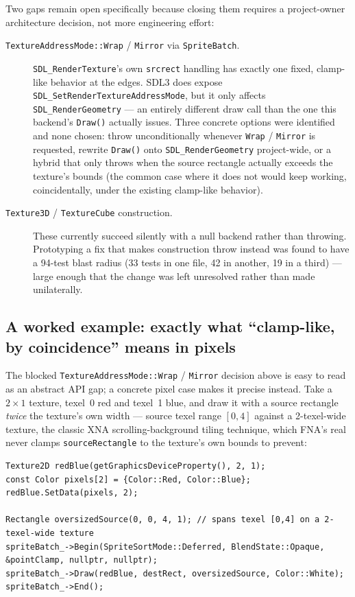 Two gaps remain open specifically because closing them requires a project-owner
architecture decision, not more engineering effort:

\begin{description}
  \item[\texttt{TextureAddressMode::Wrap} / \texttt{Mirror} via \texttt{SpriteBatch}.]
        \texttt{SDL\_RenderTexture}'s own \texttt{srcrect} handling has exactly one fixed,
        clamp-like behavior at the edges. SDL3 does expose
        \texttt{SDL\_SetRenderTextureAddressMode}, but it only affects
        \texttt{SDL\_RenderGeometry} --- an entirely different draw call than the one this
        backend's \texttt{Draw()} actually issues. Three concrete options were identified and
        none chosen: throw unconditionally whenever \texttt{Wrap} / \texttt{Mirror} is
        requested, rewrite \texttt{Draw()} onto \texttt{SDL\_RenderGeometry} project-wide, or
        a hybrid that only throws when the source rectangle actually exceeds the texture's
        bounds (the common case where it does not would keep working, coincidentally, under
        the existing clamp-like behavior).
  \item[\texttt{Texture3D} / \texttt{TextureCube} construction.] These currently succeed
        silently with a null backend rather than throwing. Prototyping a fix that makes
        construction throw instead was found to have a 94-test blast radius (33 tests in one
        file, 42 in another, 19 in a third) --- large enough that the change was left
        unresolved rather than made unilaterally.
\end{description}

\subsection{A worked example: exactly what ``clamp-like, by coincidence'' means in pixels}

The blocked \texttt{TextureAddressMode::Wrap} / \texttt{Mirror} decision above is easy to read
as an abstract API gap; a concrete pixel case makes it precise instead. Take a $2\times1$
texture, texel~0 red and texel~1 blue, and draw it with a source rectangle \emph{twice} the
texture's own width --- source texel range $[0,4]$ against a 2-texel-wide texture, the classic
XNA scrolling-background tiling technique, which FNA's real  never clamps
\texttt{sourceRectangle} to the texture's own bounds to prevent:

\begin{lstlisting}
Texture2D redBlue(getGraphicsDeviceProperty(), 2, 1);
const Color pixels[2] = {Color::Red, Color::Blue};
redBlue.SetData(pixels, 2);

Rectangle oversizedSource(0, 0, 4, 1); // spans texel [0,4] on a 2-texel-wide texture
spriteBatch_->Begin(SpriteSortMode::Deferred, BlendState::Opaque, &pointClamp, nullptr, nullptr);
spriteBatch_->Draw(redBlue, destRect, oversizedSource, Color::White);
spriteBatch_->End();
\end{lstlisting}

